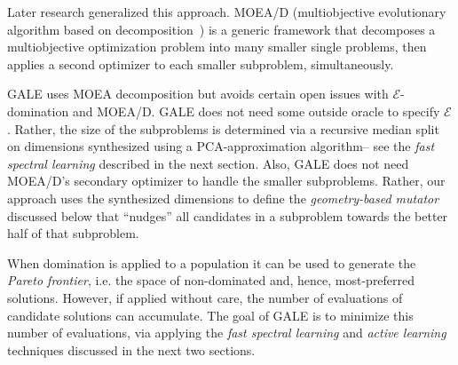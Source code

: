 \documentclass[10pt,journal,compsoc]{IEEEtran}
\newcommand{\tion}[1]{\textsection\ref{sec:#1}}
\newenvironment{changed}{\par}{\par}
\begin{document}
\begin{changed}
Later research generalized this approach. MOEA/D (multiobjective
evolutionary algorithm based on decomposition~\cite{zhang07}) is a generic framework that decomposes a multiobjective optimization problem into many smaller single problems, then applies a second optimizer to each smaller subproblem, simultaneously. 

GALE uses MOEA decomposition but avoids certain open issues with   $\mathcal{E}$-domination and MOEA/D. 
GALE does not need some outside oracle to specify $\mathcal{E}$. 
Rather, the size of the subproblems is determined via a recursive median split on dimensions synthesized using a PCA-approximation algorithm-- see the  {\em fast spectral learning} described in the next section. 
Also, GALE does not need MOEA/D's secondary optimizer to handle the smaller subproblems. 
Rather, our approach uses  the synthesized dimensions to define the {\em geometry-based mutator} discussed below that ``nudges'' all candidates in a subproblem towards the better half of that subproblem. 

\end{changed}



When domination is applied to a population it can be used to generate the {\em Pareto frontier}, i.e.  the space of non-dominated and, hence, most-preferred solutions.  
However, if applied without care, the number of evaluations of candidate solutions can accumulate.  
The goal of GALE is to minimize this number of evaluations, via applying the {\em fast spectral learning} and {\em active learning} techniques discussed in the next two sections.





\end{document}
